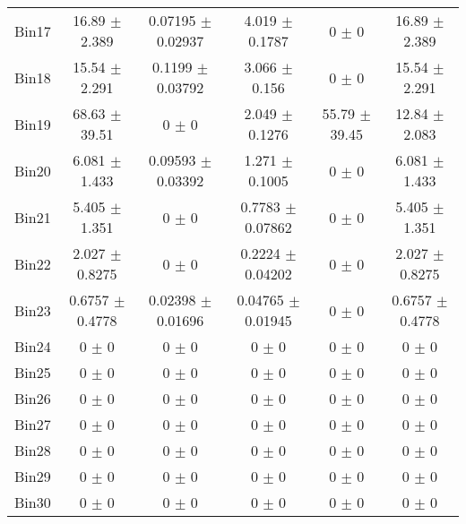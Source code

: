 \begin{tabular}{@{\extracolsep{4pt}}lccccc@{}}
     Bin17 & 16.89 $\pm$ 2.389 & 0.07195 $\pm$ 0.02937 & 4.019 $\pm$ 0.1787 & 0 $\pm$ 0 & 16.89 $\pm$ 2.389 \\ 
     Bin18 & 15.54 $\pm$ 2.291 & 0.1199 $\pm$ 0.03792 & 3.066 $\pm$ 0.156 & 0 $\pm$ 0 & 15.54 $\pm$ 2.291 \\ 
     Bin19 & 68.63 $\pm$ 39.51 & 0 $\pm$ 0 & 2.049 $\pm$ 0.1276 & 55.79 $\pm$ 39.45 & 12.84 $\pm$ 2.083 \\ 
     Bin20 & 6.081 $\pm$ 1.433 & 0.09593 $\pm$ 0.03392 & 1.271 $\pm$ 0.1005 & 0 $\pm$ 0 & 6.081 $\pm$ 1.433 \\ 
     Bin21 & 5.405 $\pm$ 1.351 & 0 $\pm$ 0 & 0.7783 $\pm$ 0.07862 & 0 $\pm$ 0 & 5.405 $\pm$ 1.351 \\ 
     Bin22 & 2.027 $\pm$ 0.8275 & 0 $\pm$ 0 & 0.2224 $\pm$ 0.04202 & 0 $\pm$ 0 & 2.027 $\pm$ 0.8275 \\ 
     Bin23 & 0.6757 $\pm$ 0.4778 & 0.02398 $\pm$ 0.01696 & 0.04765 $\pm$ 0.01945 & 0 $\pm$ 0 & 0.6757 $\pm$ 0.4778 \\ 
     Bin24 & 0 $\pm$ 0 & 0 $\pm$ 0 & 0 $\pm$ 0 & 0 $\pm$ 0 & 0 $\pm$ 0 \\ 
     Bin25 & 0 $\pm$ 0 & 0 $\pm$ 0 & 0 $\pm$ 0 & 0 $\pm$ 0 & 0 $\pm$ 0 \\ 
     Bin26 & 0 $\pm$ 0 & 0 $\pm$ 0 & 0 $\pm$ 0 & 0 $\pm$ 0 & 0 $\pm$ 0 \\ 
     Bin27 & 0 $\pm$ 0 & 0 $\pm$ 0 & 0 $\pm$ 0 & 0 $\pm$ 0 & 0 $\pm$ 0 \\ 
     Bin28 & 0 $\pm$ 0 & 0 $\pm$ 0 & 0 $\pm$ 0 & 0 $\pm$ 0 & 0 $\pm$ 0 \\ 
     Bin29 & 0 $\pm$ 0 & 0 $\pm$ 0 & 0 $\pm$ 0 & 0 $\pm$ 0 & 0 $\pm$ 0 \\ 
     Bin30 & 0 $\pm$ 0 & 0 $\pm$ 0 & 0 $\pm$ 0 & 0 $\pm$ 0 & 0 $\pm$ 0 \\ 
\hline\hline
  \end{tabular}
